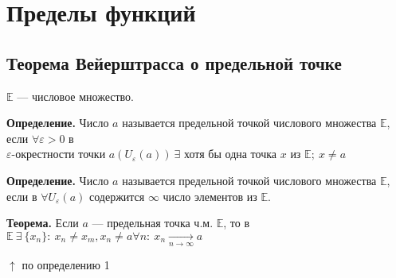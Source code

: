 \documentclass{article}
\begin{document}
    \section{Пределы функций}
    \subsection{Теорема Вейерштрасса о предельной точке}

    \(\mathbb{E}\) --- числовое множество.

    \textbf{Определение.} Число \(a\) называется предельной точкой числового множества \(\mathbb{E}\), если \(\forall \varepsilon > 0\) в \\
    \(\varepsilon\)-окрестности точки \(a(U_\varepsilon(a))\ \exists\) хотя бы одна точка \(x\) из \(\mathbb{E};\ x \neq a\)

    \textbf{Определение.} Число \(a\) называется предельной точкой числового множества \(\mathbb{E}\),
    если в \(\forall U_\varepsilon(a)\) содержится \(\infty\) число элементов из \(\mathbb{E}\).

    \textbf{Теорема.} Если \(a\) --- предельная точка ч.м. \(\mathbb{E}\), то в \(\mathbb{E}\ \exists\ \{x_n\}:\ x_n \neq x_m, x_n \neq a \forall n:\ x_n \xrightarrow[n \rightarrow \infty]{} a\)

    \(\uparrow\) по определению 1
\end{document}
